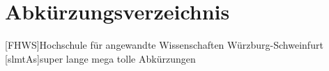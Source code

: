 
\ihead{}
\chead{}
\ohead{\pagemark}

\ifoot{}
\cfoot{}
\ofoot{}


\chapter*{Abkürzungsverzeichnis}

\thispagestyle{headings}

\setcounter{CounterSavedPageNumberingRoman}{\value{page}}

\addtocounter{CounterSavedPageNumberingRoman}{1}



\begin{acronym}[slmtA]
	[FHWS]{Hochschule für angewandte Wissenschaften Würzburg-Schweinfurt}
	[slmtAs]{super lange mega tolle Abkürzungen}
\end{acronym}
